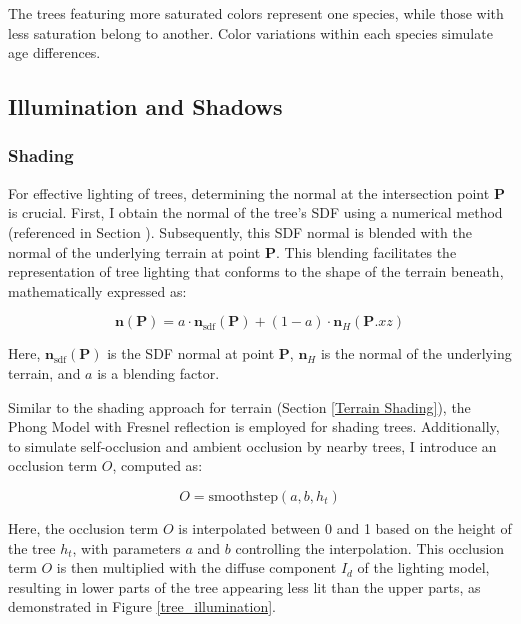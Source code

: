{The trees featuring more saturated colors represent one species, while those with less saturation belong to another. Color variations within each species simulate age differences.}

\subsection{Illumination and Shadows}

\subsubsection{Shading}

For effective lighting of trees, determining the normal at the intersection point $\mathbf{P}$ is crucial. First, I obtain the normal of the tree's SDF using a numerical method (referenced in Section ). Subsequently, this SDF normal is blended with the normal of the underlying terrain at point $\mathbf{P}$. This blending facilitates the representation of tree lighting that conforms to the shape of the terrain beneath, mathematically expressed as:

\begin{equation}
    \mathbf{n}(\mathbf{P}) = a \cdot \mathbf{n}_{\text{sdf}}(\mathbf{P}) + (1 - a) \cdot \mathbf{n}_H(\mathbf{P}.xz)
\end{equation}

Here, $\mathbf{n}_{\text{sdf}}(\mathbf{P})$ is the SDF normal at point $\mathbf{P}$, $\mathbf{n}_H$ is the normal of the underlying terrain, and $a$ is a blending factor.

Similar to the shading approach for terrain (Section \ref{Terrain Shading}), the Phong Model with Fresnel reflection is employed for shading trees. Additionally, to simulate self-occlusion and ambient occlusion by nearby trees, I introduce an occlusion term $O$, computed as:

\begin{equation}
O = \text{smoothstep}(a, b, h_t)
\end{equation}

Here, the occlusion term $O$ is interpolated between 0 and 1 based on the height of the tree $h_t$, with parameters $a$ and $b$ controlling the interpolation. This occlusion term $O$ is then multiplied with the diffuse component $I_d$ of the lighting model, resulting in lower parts of the tree appearing less lit than the upper parts, as demonstrated in Figure \ref{tree_illumination}.

